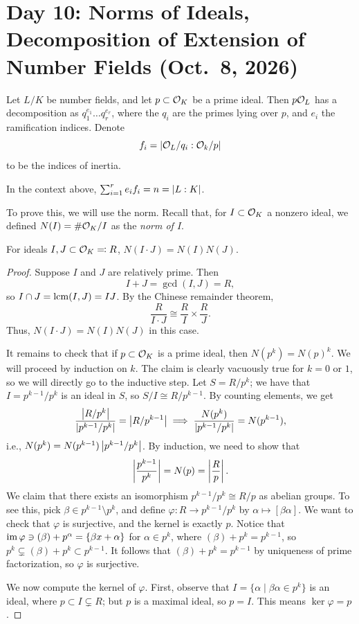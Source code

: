 \section{Day 10: Norms of Ideals, Decomposition of Extension of Number Fields (Oct.\ 8, 2026)}
Let $L/K$ be number fields, and let $p \subset \mathcal O_K$ be a prime ideal. Then $p \mathcal O_L$ has a decomposition as $q_1^{e_1} \dots q_r^{e_r}$, where the $q_i$ are the primes lying over $p$, and $e_i$ the ramification indices. Denote
\[ f_i = \left\lvert \mathcal O_L/q_i : \mathcal O_k/p \right\rvert \]
to be the indices of inertia.

\begin{theorem} \label{thm:ramification_and_inertia}
    In the context above, $\sum_{i=1}^r e_i f_i = n = \left\lvert L : K \right\rvert$.
\end{theorem}
To prove this, we will use the norm. Recall that, for $I \subset \mathcal O_K$ a nonzero ideal, we defined $N(I) = \# \mathcal O_K/I$ as the \textit{norm of $I$}.
\begin{theorem} \label{thm:norm_of_ideal_multiplicative}
    For ideals $I, J \subset \mathcal O_K \eqcolon R$, $N(I \cdot J) = N(I) N(J)$.
\end{theorem}
\begin{proof}
    Suppose $I$ and $J$ are relatively prime. Then 
    \[ I + J = \gcd(I, J) = R, \]
    so $I \cap J = \operatorname*{lcm}(I, J) = IJ$. By the Chinese remainder theorem,
    \[ \frac{R}{I \cdot J} \cong \frac{R}{I} \times \frac{R}{J}. \]
    Thus, $N(I \cdot J) = N(I) N(J)$ in this case.

    It remains to check that if $p \subset \mathcal O_K$ is a prime ideal, then $N(p^k) = N(p)^k$. We will proceed by induction on $k$. The claim is clearly vacuously true for $k = 0$ or $1$, so we will directly go to the inductive step. Let $S = R/p^k$; we have that $I = p^{k-1} / p^k$ is an ideal in $S$, so $S/I \cong R/p^{k-1}$. By counting elements, we get
    \[ \frac{\left\lvert R/p^k \right\rvert}{\left\lvert p^{k-1} / p^k \right\rvert} = \left\lvert R/p^{k-1} \right\rvert \implies \frac{N(p^k)}{\left\lvert p^{k-1} / p^k \right\rvert} = N(p^{k-1}), \]
    i.e., $N(p^k) = N(p^{k-1}) \left\lvert p^{k-1} / p^k \right\rvert$. By induction, we need to show that
    \[ \left\lvert \frac{p^{k-1}}{p^k} \right\rvert = N(p) = \left\lvert \frac{R}{p} \right\rvert. \]
    We claim that there exists an isomorphism $p^{k-1}/p^k \cong R/p$ as abelian groups. To see this, pick $\beta \in p^{k-1} \setminus p^k$, and define $\varphi \colon R \to p^{k-1}/p^k$ by $\alpha \mapsto [\beta \alpha]$. We want to check that $\varphi$ is surjective, and the kernel is exactly $p$. Notice that $\operatorname{im} \varphi \ni (\beta) + p^\alpha = \{\beta x + \alpha\}$ for $\alpha \in p^k$, where $(\beta) + p^k = p^{k-1}$, so $p^k \subsetneq (\beta) + p^k \subset p^{k-1}$. It follows that $(\beta) + p^k = p^{k-1}$ by uniqueness of prime factorization, so $\varphi$ is surjective.

    We now compute the kernel of $\varphi$. First, observe that $I = \{\alpha \mid \beta \alpha \in p^k\}$ is an ideal, where $p \subset I \subsetneq R$; but $p$ is a maximal ideal, so $p = I$. This means $\ker \varphi = p$.
\end{proof}

